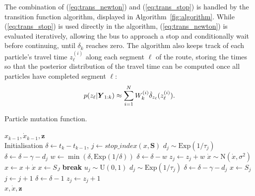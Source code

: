 The combination of (\ref{eq:trans_newton}) and (\ref{eq:trans_stop})
is handled by the transition function algorithm,
displayed in Algorithm~\ref{fig:algorithm}.
While (\ref{eq:trans_stop}) is used directly in the algorithm,
(\ref{eq:trans_newton}) is evaluated iteratively,
allowing the bus to approach a stop
and conditionally wait before continuing,
until $\delta_k$ reaches zero.
The algorithm also keeps track of each particle's travel time $z_\ell^{(i)}$
along each segment $\ell$ of the route,
storing the times so that the posterior distribution of the travel time
can be computed once all particles have completed segment $\ell$:
\begin{equation}
\label{eq:post_tt}
p(z_\ell | \mbox{$\boldsymbol{Y}$}_{1:k}) \approx
    \sum_{i=1}^N W_k^{(i)} \dot\delta_{z_\ell}(z_\ell^{(i)}).
\end{equation}



\renewcommand{\algorithmicrequire}{\textbf{Start:}}
\newcommand{\algorithmicbreak}{\textbf{break}}
\newcommand{\Break}{\State \algorithmicbreak}
\begin{algorithm}[t]
    \caption{Particle mutation function.}
    \label{fig:algorithm}
    \begin{algorithmic}[2]
    \Require $x_{k-1}, \dot x_{k-1}, \boldsymbol z$\\
    Initialisation $\delta \gets t_k - t_{k-1}$, 
        $j \gets stop\_index(x, \boldsymbol{S})$
        \State $d_j \sim \mathrm{Exp}(1/\tau_j)$
        \State $\delta \gets \delta - \gamma - d_j$
        \State $w \gets \min(\delta, \mathrm{Exp}(1/\delta))$
        \State $\delta \gets \delta - w$
        \State $z_j \gets z_j + w$
    \EndIf
        \State $\dot x \sim \mathrm{N}(\dot x, \sigma^2)$
        \State $x \leftarrow x + \dot x$
                \State $x \gets S_J$
                \Break
            \EndIf
            \State $u_j \sim \mathrm{U}(0,1)$
                \State $d_j \sim \mathrm{Exp}(1/\tau_j)$
                \State $\delta \gets \delta - \gamma - d_j$
                \State $x \gets S_j$
            \EndIf
            \State $j\gets j+1$
        \EndIf
        \State $\delta \gets \delta - 1$
        \State $z_j \gets z_j + 1$
    \EndWhile
    \\
    \Return $x, \dot x, \boldsymbol z$
    \end{algorithmic}
\end{algorithm}

